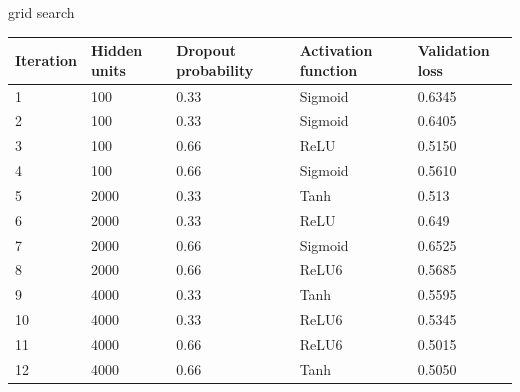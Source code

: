 \documentclass[12pt,fleqn]{article}
\begin{document}
 
grid search
\begin{table}[H]
	\begin{tabular}{|l|l|l|l|l|}
		\hline
		Iteration & Hidden units & Dropout probability & Activation function & Validation loss \\ \hline
		1         & 100          & 0.33                & Sigmoid             & 0.6345          \\ \hline
		2         & 100          & 0.33                & Sigmoid             & 0.6405          \\ \hline
		3         & 100          & 0.66                & ReLU                & 0.5150          \\ \hline
		4         & 100          & 0.66                & Sigmoid             & 0.5610          \\ \hline
		5         & 2000         & 0.33                & Tanh                & 0.513           \\ \hline
		6         & 2000         & 0.33                & ReLU                & 0.649           \\ \hline
		7         & 2000         & 0.66                & Sigmoid             & 0.6525          \\ \hline
		8         & 2000         & 0.66                & ReLU6               & 0.5685          \\ \hline
		9         & 4000         & 0.33                & Tanh                & 0.5595          \\ \hline
		10        & 4000         & 0.33                & ReLU6               & 0.5345          \\ \hline
		11        & 4000         & 0.66                & ReLU6               & 0.5015          \\ \hline
		12        & 4000         & 0.66                & Tanh                & 0.5050          \\ \hline
	\end{tabular}
\end{table}
\end{document}
